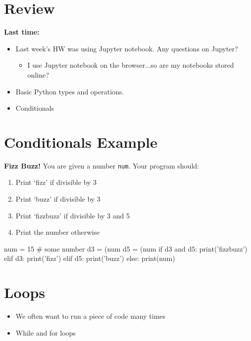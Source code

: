 \documentclass[12pt]{article}
\numberwithin{equation}{section}
\begin{document}

\section{Review}

\textbf{Last time:}
\begin{itemize}
    \item Last week's HW was using Jupyter notebook. Any questions on Jupyter?
    \begin{itemize}
    	\item I use Jupyter notebook on the browser...so are my notebooks stored online?
    \end{itemize}
    \item Basic Python types and operations.
    \item Conditionals
\end{itemize}

\section{Conditionals Example}
\textbf{Fizz Buzz!} You are given a number \verb|num|. Your program should:
\begin{enumerate}
    \item Print `fizz' if divisible by 3
    \item Print `buzz' if divisible by 3
    \item Print `fizzbuzz' if divisible by 3 and 5
    \item Print the number otherwise
\end{enumerate}

\begin{python}
num = 15 # some number
d3 = (num%
d5 = (num%
if d3 and d5:
    print('fizzbuzz')
elif d3:
    print('fizz')
elif d5:
    print('buzz')
else:
    print(num)
\end{python}

\section{Loops}
\begin{itemize}
    \item We often want to run a piece of code many times
    \item While and for loops
\end{itemize}
\end{document}
